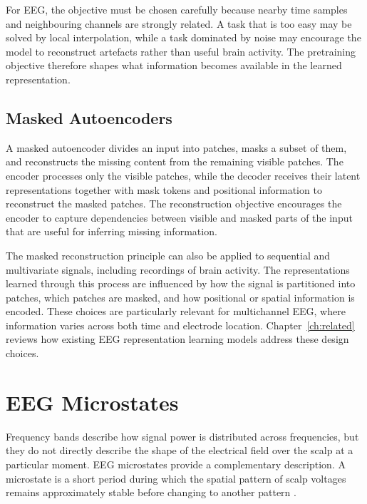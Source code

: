 For EEG, the objective must be chosen carefully because nearby time samples and neighbouring channels are strongly related. A task that is too easy may be solved by local interpolation, while a task dominated by noise may encourage the model to reconstruct artefacts rather than useful brain activity. The pretraining objective therefore shapes what information becomes available in the learned representation.

\subsection{Masked Autoencoders}

A masked autoencoder \parencite[MAE;][]{heMaskedAutoencodersAre2022} divides an input into patches, masks a subset of them, and reconstructs the missing content from the remaining visible patches. The encoder processes only the visible patches, while the decoder receives their latent representations together with mask tokens and positional information to reconstruct the masked patches. The reconstruction objective encourages the encoder to capture dependencies between visible and masked parts of the input that are useful for inferring missing information.

The masked reconstruction principle can also be applied to sequential and multivariate signals, including recordings of brain activity. The representations learned through this process are influenced by how the signal is partitioned into patches, which patches are masked, and how positional or spatial information is encoded. These choices are particularly relevant for multichannel EEG, where information varies across both time and electrode location. Chapter~\ref{ch:related} reviews how existing EEG representation learning models address these design choices.


\section{EEG Microstates}\label{sec:bg_microstates}

Frequency bands describe how signal power is distributed across frequencies, but they do not directly describe the shape of the electrical field over the scalp at a particular moment. EEG microstates provide a complementary description. A microstate is a short period during which the spatial pattern of scalp voltages remains approximately stable before changing to another pattern \parencite{391164,michelEEGMicrostatesTool2018a}.

